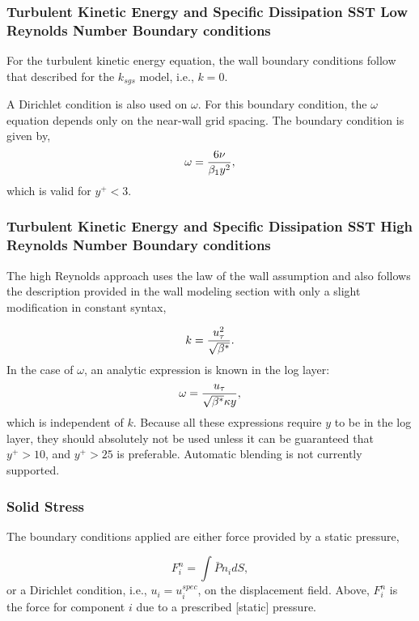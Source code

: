 \subsubsection{Turbulent Kinetic Energy and Specific Dissipation SST Low Reynolds Number Boundary conditions}

For the turbulent kinetic energy equation, the wall boundary conditions follow that described for 
the $k_{sgs}$ model, i.e., $k=0$.

A Dirichlet condition is also used on $\omega$.  For this boundary condition, the $\omega$ equation depends only on the near-wall 
grid spacing.  The boundary condition is given by,
\begin{equation}
\omega = {6 \nu \over \beta_1 y^{2}},
\end{equation}
which is valid for $y^{+} < 3$. 

\subsubsection{Turbulent Kinetic Energy and Specific Dissipation SST High Reynolds Number Boundary conditions}
The high Reynolds approach uses the law of the wall assumption and also follows the description 
provided in the wall modeling section with only a slight modification in constant syntax,

\begin{equation}
k = {u_{\tau}^{2} \over \sqrt{\beta^*}}.
\label{wallModelTke}
\end{equation}
% 
In the case of $\omega$, an analytic expression is known in the log layer:
\begin{equation}
\omega = {u_{\tau} \over \sqrt{\beta^*} \kappa y},
\end{equation}
which is independent of $k$.  Because all these expressions require $y$ to be in the log layer, 
they should absolutely not be used unless it can be guaranteed that $y^{+} > 10$, and $y^{+} > 25$ is preferable.
%
Automatic blending is not currently supported.

\subsubsection{Solid Stress}
The boundary conditions applied are either force provided by a static pressure, 

\begin{equation}
 F^n_i = \int \bar{P} n_i dS,
\label{displacement}
\end{equation}
%
or a Dirichlet condition, i.e., $u_i = u^{spec}_i$, on the displacement field. Above, $F^n_i$ is the force for
component $i$ due to a prescribed [static] pressure. 


